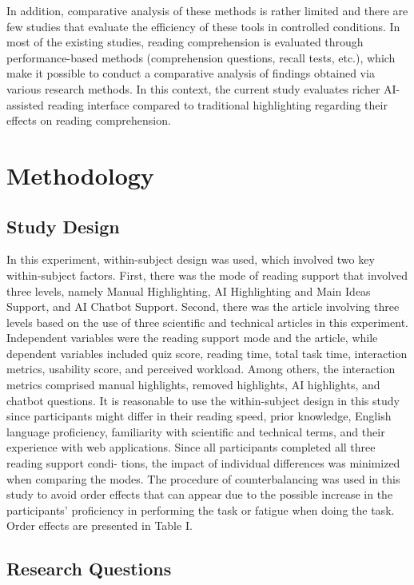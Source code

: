 \documentclass{IEEEtran}
\begin{document}
In addition, comparative analysis of these methods is rather limited and there are few studies that evaluate the efficiency of these tools in controlled conditions. In most of the existing studies, reading comprehension is evaluated through performance-based methods (comprehension questions, recall tests, etc.), which make it possible to conduct a comparative analysis of findings obtained via various research methods. In this context, the current study evaluates richer AI-assisted reading interface compared to traditional highlighting regarding their effects on reading comprehension.

\section{Methodology}

\subsection{Study Design}

In this experiment, within-subject design was used,
which involved two key within-subject factors. First, there was
the mode of reading support that involved three levels, namely
Manual Highlighting, AI Highlighting and Main Ideas Support,
and AI Chatbot Support. Second, there was the article involving
three levels based on the use of three scientific and technical
articles in this experiment. Independent variables were the reading
support mode and the article, while dependent variables included
quiz score, reading time, total task time, interaction metrics,
usability score, and perceived workload. Among others, the interaction
metrics comprised manual highlights, removed highlights, AI
highlights, and chatbot questions.
It is reasonable to use the within-subject design in this
study since participants might differ in their reading speed, prior
knowledge, English language proficiency, familiarity with scientific
and technical terms, and their experience with web applications.
Since all participants completed all three reading support condi-
tions, the impact of individual differences was minimized when
comparing the modes.
The procedure of counterbalancing was used in this study
to avoid order effects that can appear due to the possible increase
in the participants' proficiency in performing the task or fatigue
when doing the task. Order effects are presented in Table I.

\subsection{Research Questions}
\end{document}
